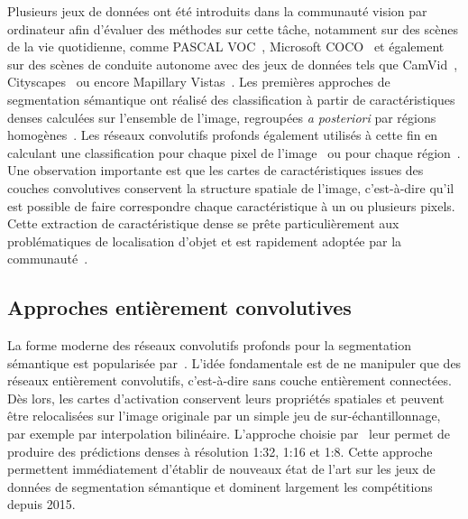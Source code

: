 Plusieurs jeux de données ont été introduits dans la communauté vision par ordinateur afin d'évaluer des méthodes sur cette tâche, notamment sur des scènes de la vie quotidienne, comme PASCAL VOC~\cite{everingham_pascal_2014}, Microsoft COCO~\cite{lin_microsoft_2014} et également sur des scènes de conduite autonome avec des jeux de données tels que CamVid~\cite{brostow_semantic_2009}, Cityscapes~\cite{cordts_cityscapes_2016} ou encore Mapillary Vistas~\cite{neuhold_mapillary_2017}. Les premières approches de segmentation sémantique ont réalisé des classification à partir de caractéristiques denses calculées sur l'ensemble de l'image, regroupées \emph{a posteriori} par régions homogènes~\cite{shotton_semantic_2008,shotton_real-time_2011}. Les réseaux convolutifs profonds également utilisés à cette fin en calculant une classification pour chaque pixel de l'image~\cite{grangier_deep_2009,ciresan_deep_2012} ou pour chaque région~\cite{farabet_towards_2013,sermanet_overfeat_2013}. Une observation importante est que les cartes de caractéristiques issues des couches convolutives conservent la structure spatiale de l'image, c'est-à-dire qu'il est possible de faire correspondre chaque caractéristique à un ou plusieurs pixels. Cette extraction de caractéristique dense se prête particulièrement aux problématiques de localisation d'objet et est rapidement adoptée par la communauté~\cite{zou_generic_2014}.

\subsection{Approches entièrement convolutives}


La forme moderne des réseaux convolutifs profonds pour la segmentation sémantique est popularisée par~\citet{long_fully_2015}. L'idée fondamentale est de ne manipuler que des réseaux entièrement convolutifs, c'est-à-dire sans couche entièrement connectées. Dès lors, les cartes d'activation conservent leurs propriétés spatiales et peuvent être relocalisées sur l'image originale par un simple jeu de sur-échantillonnage, par exemple par interpolation bilinéaire. L'approche choisie par~\citet{long_fully_2015} leur permet de produire des prédictions denses à résolution 1:32, 1:16 et 1:8. Cette approche permettent immédiatement d'établir de nouveaux état de l'art sur les jeux de données de segmentation sémantique et dominent largement les compétitions depuis 2015.


